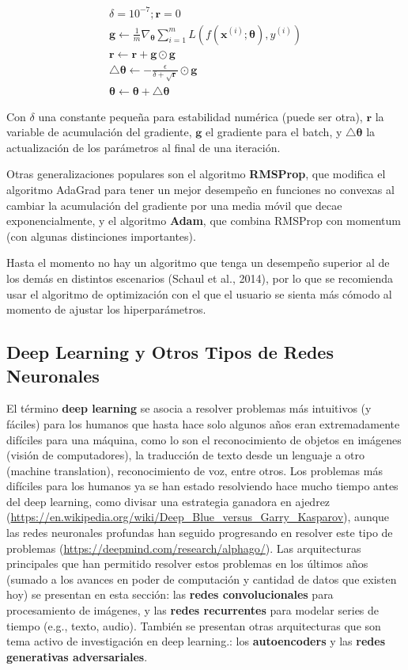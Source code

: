 \begin{gather*}
\delta = 10^{-7}; \bm{r} = 0
\\
\bm{g} \longleftarrow \frac{1}{m}\nabla_{\bm{\theta}}\sum_{i=1}^{m}L(f(\bm{x}^{(i)};\bm{\theta}),y^{(i)})
\\
\bm{r} \longleftarrow \bm{r} + \bm{g}\odot \bm{g}
\\
\bigtriangleup\bm{\theta} \longleftarrow -\frac{\epsilon}{\delta+\sqrt{\bm{r}}}\odot \bm{g}
\\
\bm{\theta} \longleftarrow \bm{\theta}+\bigtriangleup\bm{\theta}
\end{gather*}

Con $\delta$ una constante peque{\~{n}}a para estabilidad num\'erica (puede ser otra), $\bm{r}$ la variable de acumulaci\'on del gradiente, $\bm{g}$ el gradiente para el batch, y $\bigtriangleup\bm{\theta}$ la actualizaci\'on de los par\'ametros al final de una iteraci\'on.

Otras generalizaciones populares son el algoritmo \textbf{RMSProp}, que modifica el algoritmo AdaGrad para tener un mejor desempe{\~{n}}o en funciones no convexas al cambiar la acumulaci\'on del gradiente por una media m\'ovil que decae exponencialmente, y el algoritmo \textbf{Adam}, que combina RMSProp con momentum (con algunas distinciones importantes).

Hasta el momento no hay un algoritmo que tenga un desempe{\~{n}}o superior al de los dem\'as en distintos escenarios (Schaul et al., 2014), por lo que se recomienda usar el algoritmo de optimizaci\'on con el que el usuario se sienta m\'as c\'omodo al momento de ajustar los hiperpar\'ametros.

\subsection{Deep Learning y Otros Tipos de Redes Neuronales}

El t\'ermino \textbf{deep learning} se asocia a resolver problemas m\'as intuitivos (y f\'aciles) para los humanos que hasta hace solo algunos a{\~{n}}os eran extremadamente dif\'iciles para una m\'aquina, como lo son el reconocimiento de objetos en im\'agenes (visi\'on de computadores), la traducci\'on de texto desde un lenguaje a otro (machine translation), reconocimiento de voz, entre otros. Los problemas m\'as dif\'iciles para los humanos ya se han estado resolviendo hace mucho tiempo antes del deep learning, como divisar una estrategia ganadora en ajedrez (\url{https://en.wikipedia.org/wiki/Deep_Blue_versus_Garry_Kasparov}), aunque las redes neuronales profundas han seguido progresando en resolver este tipo de problemas (\url{https://deepmind.com/research/alphago/}). Las arquitecturas principales que han permitido resolver estos problemas en los \'ultimos a{\~{n}}os (sumado a los avances en poder de computaci\'on y cantidad de datos que existen hoy) se presentan en esta secci\'on: las \textbf{redes convolucionales} para procesamiento de im\'agenes, y las \textbf{redes recurrentes} para modelar series de tiempo (e.g., texto, audio). Tambi\'en se presentan otras arquitecturas que son tema activo de investigaci\'on en deep learning.: los \textbf{autoencoders} y las \textbf{redes generativas adversariales}.

